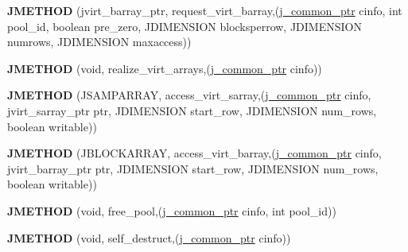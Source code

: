 \begin{DoxyCompactItemize}
\item 
\hypertarget{structjpeg__memory__mgr_aee93326ad6a64714443e90044614d2a6}{{\bfseries J\-M\-E\-T\-H\-O\-D} (jvirt\-\_\-barray\-\_\-ptr, request\-\_\-virt\-\_\-barray,(\hyperlink{structjpeg__common__struct}{j\-\_\-common\-\_\-ptr} cinfo, int pool\-\_\-id, boolean pre\-\_\-zero, J\-D\-I\-M\-E\-N\-S\-I\-O\-N blocksperrow, J\-D\-I\-M\-E\-N\-S\-I\-O\-N numrows, J\-D\-I\-M\-E\-N\-S\-I\-O\-N maxaccess))}\label{structjpeg__memory__mgr_aee93326ad6a64714443e90044614d2a6}

\item 
\hypertarget{structjpeg__memory__mgr_a35cc0c3b3ecbc7209cdc23b2255932d8}{{\bfseries J\-M\-E\-T\-H\-O\-D} (void, realize\-\_\-virt\-\_\-arrays,(\hyperlink{structjpeg__common__struct}{j\-\_\-common\-\_\-ptr} cinfo))}\label{structjpeg__memory__mgr_a35cc0c3b3ecbc7209cdc23b2255932d8}

\item 
\hypertarget{structjpeg__memory__mgr_a747ad4316a4794b13f9fdff4f6f699ca}{{\bfseries J\-M\-E\-T\-H\-O\-D} (J\-S\-A\-M\-P\-A\-R\-R\-A\-Y, access\-\_\-virt\-\_\-sarray,(\hyperlink{structjpeg__common__struct}{j\-\_\-common\-\_\-ptr} cinfo, jvirt\-\_\-sarray\-\_\-ptr ptr, J\-D\-I\-M\-E\-N\-S\-I\-O\-N start\-\_\-row, J\-D\-I\-M\-E\-N\-S\-I\-O\-N num\-\_\-rows, boolean writable))}\label{structjpeg__memory__mgr_a747ad4316a4794b13f9fdff4f6f699ca}

\item 
\hypertarget{structjpeg__memory__mgr_aa460f4b500825e051306b8ce5583d052}{{\bfseries J\-M\-E\-T\-H\-O\-D} (J\-B\-L\-O\-C\-K\-A\-R\-R\-A\-Y, access\-\_\-virt\-\_\-barray,(\hyperlink{structjpeg__common__struct}{j\-\_\-common\-\_\-ptr} cinfo, jvirt\-\_\-barray\-\_\-ptr ptr, J\-D\-I\-M\-E\-N\-S\-I\-O\-N start\-\_\-row, J\-D\-I\-M\-E\-N\-S\-I\-O\-N num\-\_\-rows, boolean writable))}\label{structjpeg__memory__mgr_aa460f4b500825e051306b8ce5583d052}

\item 
\hypertarget{structjpeg__memory__mgr_a7e7e063767441999982d22c5cc0e9423}{{\bfseries J\-M\-E\-T\-H\-O\-D} (void, free\-\_\-pool,(\hyperlink{structjpeg__common__struct}{j\-\_\-common\-\_\-ptr} cinfo, int pool\-\_\-id))}\label{structjpeg__memory__mgr_a7e7e063767441999982d22c5cc0e9423}

\item 
\hypertarget{structjpeg__memory__mgr_ae80ddea0ba4f845f91d3a30e350b5f44}{{\bfseries J\-M\-E\-T\-H\-O\-D} (void, self\-\_\-destruct,(\hyperlink{structjpeg__common__struct}{j\-\_\-common\-\_\-ptr} cinfo))}\label{structjpeg__memory__mgr_ae80ddea0ba4f845f91d3a30e350b5f44}


\end{DoxyCompactItemize}
